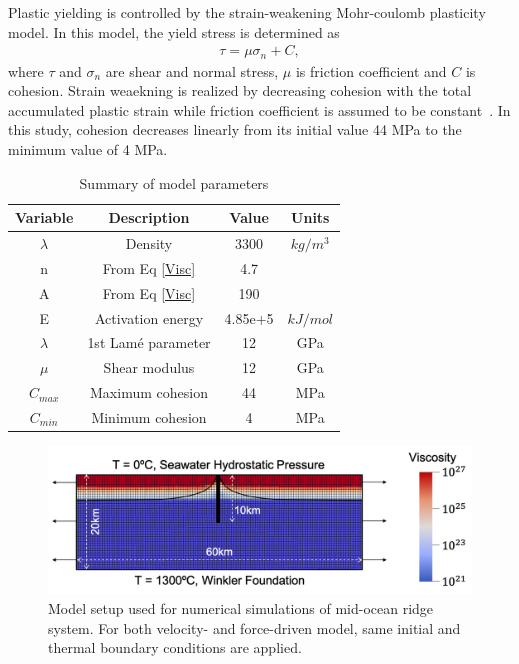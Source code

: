 \documentclass[letterpaper,12pt,notitle]{memphisthesis}                     %
\begin{document}
Plastic yielding is controlled by the strain-weakening Mohr-coulomb plasticity model. In this model, the yield stress is determined as
\begin{align}
 \tau = \mu \sigma_n + C,
\end{align}
where $\tau$ and $\sigma_{n}$ are shear and normal stress, $\mu$ is friction coefficient and $C$ is cohesion.
%
Strain weaekning is realized by decreasing cohesion with the total accumulated plastic strain while friction coefficient is assumed to be constant~\citep{Poliakov1998}. In this study, cohesion decreases linearly from its initial value 44 MPa to the minimum value of 4 MPa.
%
\begin{table}[h!]
	\centering
	\caption{Summary of model parameters}
	\label{tab:modelparams}
	\begin{tabular}{cccc}
		\toprule
		Variable & Description & Value & Units\\
		\midrule
          	$\lambda$ & Density & 3300 & $kg/m^3$\\
	        n & From Eq \ref{Visc} & 4.7 & \\
	        A & From Eq \ref{Visc} & 190 & \\
	        E & Activation energy & 4.85e+5 & $kJ/mol$ \\
	        $\lambda$ & 1st Lam\'e parameter & 12 & GPa\\
	        $\mu$ & Shear modulus & 12 & GPa\\
	        $C_{max}$ & Maximum cohesion & 44 & MPa\\
	        $C_{min}$ & Minimum cohesion & 4 & MPa\\
		\bottomrule
	\end{tabular}
\end{table}
%
\begin{figure}[!htb]
	\centering
	\includegraphics[width=0.8\linewidth]{./figs/modelsetup.png}
	\caption{Model setup used for numerical simulations of mid-ocean ridge system. For both velocity- and force-driven model, same initial and thermal boundary conditions are applied.}
	\label{fig:modelsetup}
\end{figure}
%
\end{document}

